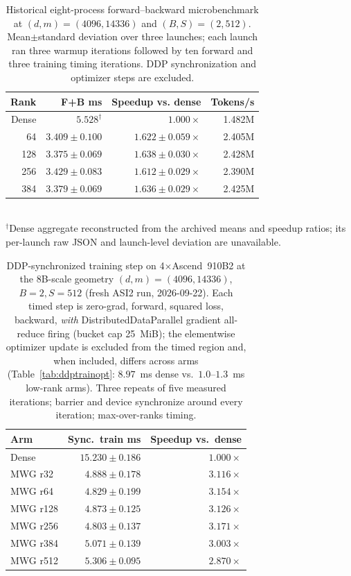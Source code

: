 \begin{table}[h]
\centering
\caption{Historical eight-process forward--backward microbenchmark at
$(d,m)=(4096,14336)$ and $(B,S)=(2,512)$.  Mean$\pm$standard deviation over
three launches; each launch ran three warmup iterations followed by ten
forward and three training timing iterations.  DDP synchronization and
optimizer steps are excluded.}
\label{tab:scalingsweep}
\begin{tabular}{rrrr}
\toprule
Rank & F+B ms & Speedup vs. dense & Tokens/s \\
\midrule
Dense & $5.528^{\dagger}$ & $1.000\times$ & 1.482M \\
64  & $3.409\pm0.100$ & $1.622\pm0.059\times$ & 2.405M \\
128 & $3.375\pm0.069$ & $1.638\pm0.030\times$ & 2.428M \\
256 & $3.429\pm0.083$ & $1.612\pm0.029\times$ & 2.390M \\
384 & $3.379\pm0.069$ & $1.636\pm0.029\times$ & 2.425M \\
\bottomrule
\end{tabular}
\\[-1mm]
{\footnotesize $^{\dagger}$Dense aggregate reconstructed from the archived
means and speedup ratios; its per-launch raw JSON and launch-level deviation
are unavailable.}
\end{table}

\begin{table}[h]
\centering
\caption{DDP-synchronized training step on 4$\times$Ascend~910B2 at the
8B-scale geometry $(d,m)=(4096,14336)$, $B{=}2,S{=}512$ (fresh ASI2 run,
2026-09-22).  Each timed step is zero-grad, forward, squared loss, backward,
\emph{with} DistributedDataParallel gradient all-reduce firing (bucket cap
25~MiB); the elementwise optimizer update is excluded from the timed region
and, when included, differs across arms (Table~\ref{tab:ddptrainopt}:
$8.97$~ms dense vs.\ $1.0$--$1.3$~ms low-rank arms).  Three repeats of
five measured iterations; barrier and device
synchronize around every iteration; max-over-ranks timing.}
\label{tab:ddptrain}
\begin{tabular}{lrr}
\toprule
Arm & Sync.\ train ms & Speedup vs.\ dense \\
\midrule
Dense & $15.230\pm0.186$ & $1.000\times$ \\
MWG r32  & $4.888\pm0.178$ & $3.116\times$ \\
MWG r64  & $4.829\pm0.199$ & $3.154\times$ \\
MWG r128 & $4.873\pm0.125$ & $3.126\times$ \\
MWG r256 & $4.803\pm0.137$ & $3.171\times$ \\
MWG r384 & $5.071\pm0.139$ & $3.003\times$ \\
MWG r512 & $5.306\pm0.095$ & $2.870\times$ \\
\bottomrule
\end{tabular}
\end{table}

